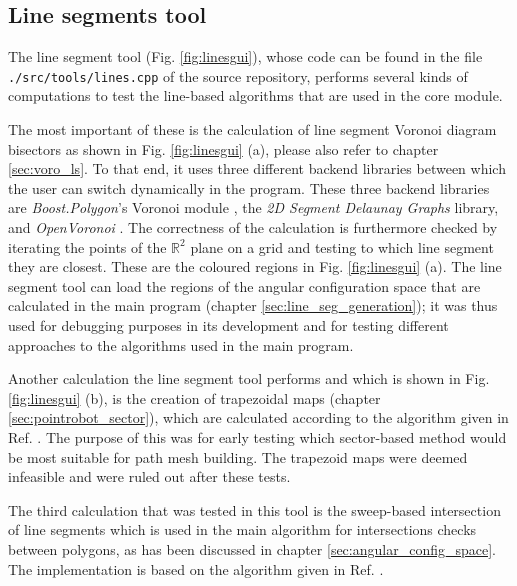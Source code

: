 \subsection{Line segments tool}
\label{sec:tests_linesegs}
The line segment tool (Fig. \ref{fig:linesgui}), whose code can be found in the file 
\lstinline|./src/tools/lines.cpp| of the source repository, 
performs several kinds of computations to test the line-based algorithms that are used in the core module.

The most important of these is the calculation of line segment Voronoi diagram bisectors as shown in 
Fig. \ref{fig:linesgui} (a), please also refer to chapter \ref{sec:voro_ls}.
To that end, it uses three different backend libraries between which the user can switch dynamically in
the program. These three backend libraries are \textit{Boost.Polygon}'s Voronoi module \cite{web_boost_polygon_voronoi, web_boost_polygon_voronoi_visual_utils},
the \textit{2D Segment Delaunay Graphs} \cite{web_2dsegdel} library, and \textit{OpenVoronoi} \cite{web_openvoronoi}.
The correctness of the calculation is furthermore checked by iterating the points of the $\mathbb{R}^2$ plane
on a grid and testing to which line segment they are closest. These are the coloured regions in Fig. \ref{fig:linesgui} (a).
The line segment tool can load the regions of the angular configuration space that are calculated in the main
program (chapter \ref{sec:line_seg_generation}); it was thus used for debugging purposes in its development and
for testing different approaches to the algorithms used in the main program.

Another calculation the line segment tool performs and which is shown in Fig. \ref{fig:linesgui} (b), is the 
creation of trapezoidal maps (chapter \ref{sec:pointrobot_sector}), which are calculated according to the 
algorithm given in Ref. \cite[Ch. 6, pp. 121-146]{Berg2008}.
The purpose of this was for early testing which sector-based method would be most suitable
for path mesh building. The trapezoid maps were deemed infeasible and were ruled out after
these tests.

The third calculation that was tested in this tool is the sweep-based intersection of line segments which
is used in the main algorithm for intersections checks between polygons, as has been discussed in 
chapter \ref{sec:angular_config_space}.
The implementation is based on the algorithm given in Ref. \cite[Ch. 2, pp. 69-80]{FUH_geo2020}.

